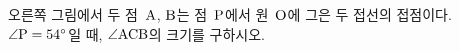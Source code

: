 \noindent\begin{minipage}[t]{0.58\linewidth}\vspace{0pt}\raggedright 오른쪽 그림에서 두 점~$\mathrm{A}$, $\mathrm{B}$는 점~$\mathrm{P}$에서 원~$\mathrm{O}$에 그은 두 접선의 접점이다. $\angle\mathrm{P}=54^\circ$일 때, $\angle\mathrm{ACB}$의 크기를 구하시오.\end{minipage}\hfill\begin{minipage}[t]{0.4\linewidth}\vspace{0pt}\centering \resizebox{\ifdim\width>\linewidth\linewidth\else\width\fi}{!}{}\end{minipage}\par

